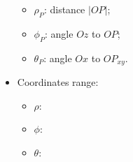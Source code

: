 \begin{frame}
\begin{columns}
\begin{itemize}
\begin{itemize}
\item \alert<3>{$\rho_P$: distance $|OP|$;}
\item \alert<4>{$\phi_P$: angle $Oz$ to $OP$;}
\item \alert<5>{$\theta_P$: angle $Ox$ to $OP_{xy}$.}
\end{itemize}
\item<6-> Coordinates range:
\begin{itemize}
\item \alert<7,8>{$\rho$:} \uncover<8->{\alert<8>{ $[0,\infty)$;}}
\item \alert<9,10>{$\phi$:}  
\item \alert<11,12>{$\theta$:}  \uncover<12->{ \alert<12>{$[0,2\pi)$.}}
\end{itemize}
\end{itemize}
\end{columns}
\end{frame}